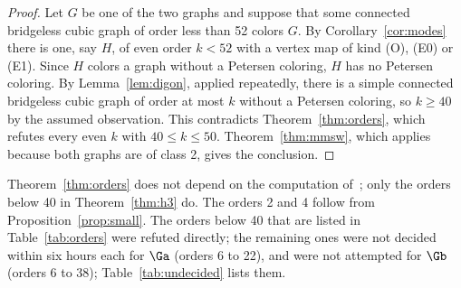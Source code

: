 \begin{proof}
Let $G$ be one of the two graphs and suppose that some connected bridgeless cubic graph of order
less than 52 colors $G$. By Corollary~\ref{cor:modes} there is one, say $H$, of even order
$k < 52$ with a vertex map of kind (O), (E0) or (E1). Since $H$ colors a graph without a Petersen
coloring, $H$ has no Petersen coloring. By Lemma~\ref{lem:digon}, applied repeatedly, there is a
simple connected bridgeless cubic graph of order at most $k$ without a Petersen coloring, so
$k \ge 40$ by the assumed observation. This contradicts Theorem~\ref{thm:orders}, which refutes every even
$k$ with $40 \le k \le 50$. Theorem~\ref{thm:mmsw}, which applies because both graphs are of class 2, gives the conclusion.
\end{proof}

Theorem~\ref{thm:orders} does not depend on the computation of~\cite{GJMMMU2026}; only the orders
below 40 in Theorem~\ref{thm:h3} do. The orders 2 and 4 follow from Proposition~\ref{prop:small}. The orders below 40 that are listed in
Table~\ref{tab:orders} were refuted directly; the remaining ones were not decided within six
hours each for $\Ga$ (orders 6 to 22), and were not attempted for $\Gb$ (orders 6 to 38); Table~\ref{tab:undecided} lists them.

